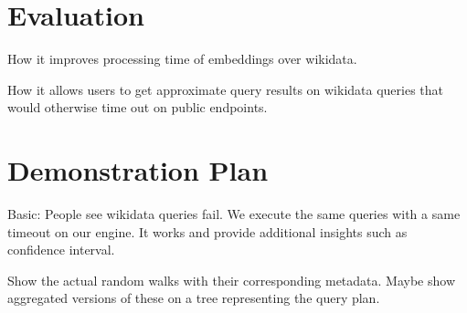 
\section{Evaluation}


How it improves processing time of embeddings over wikidata.

How it allows users to get approximate query results on wikidata
queries that would otherwise time out on public endpoints. 


\section{Demonstration Plan}


Basic: People see wikidata queries fail. We execute the same queries
with a same timeout on our engine. It works and provide additional
insights such as confidence interval.


Show the actual random walks with their corresponding metadata. Maybe
show aggregated versions of these on a tree representing the query plan.
